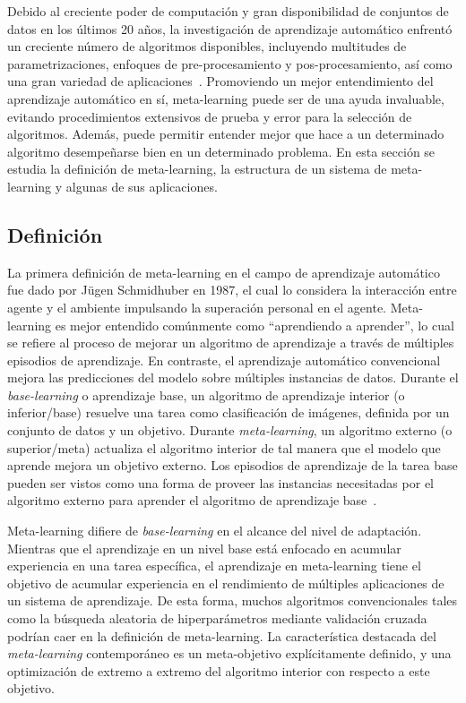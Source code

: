 Debido al creciente poder de computación y gran disponibilidad de conjuntos de
datos en los últimos 20 años, la investigación de aprendizaje automático
enfrentó un creciente número de algoritmos disponibles, incluyendo multitudes
de parametrizaciones, enfoques de pre-procesamiento y pos-procesamiento, así
como una gran variedad de aplicaciones~.
Promoviendo un mejor entendimiento del aprendizaje automático en sí,
meta-learning puede ser de una ayuda invaluable, evitando procedimientos
extensivos de prueba y error para la selección de algoritmos. Además, puede
permitir entender mejor que hace a un determinado algoritmo desempeñarse bien
en un determinado problema. En esta sección se estudia la definición de
meta-learning, la estructura de un sistema de meta-learning y algunas de sus
aplicaciones.

\subsection{Definición}\label{subsec:meta-definition}

La primera definición de meta-learning en el campo de aprendizaje automático
fue dado por J\"ugen Schmidhuber en 1987, el cual lo considera la interacción
entre agente y el ambiente impulsando la superación personal en el agente.
Meta-learning es mejor entendido comúnmente como ``aprendiendo a aprender'',
lo cual se refiere al proceso de mejorar un algoritmo de aprendizaje a través
de múltiples episodios de aprendizaje. En contraste, el aprendizaje automático
convencional mejora las predicciones del modelo sobre múltiples instancias de
datos. Durante el \textit{base-learning} o aprendizaje base, un algoritmo de
aprendizaje interior (o inferior/base) resuelve una tarea como clasificación
de imágenes, definida por un conjunto de datos y un objetivo. Durante
\emph{meta-learning}, un algoritmo externo (o superior/meta) actualiza el
algoritmo interior de tal manera que el modelo que aprende mejora un objetivo
externo. Los episodios de aprendizaje de la tarea base pueden ser vistos como
una forma de proveer las instancias necesitadas por el algoritmo externo para
aprender el algoritmo de aprendizaje base~\cite{hospedales2021metalearning}.

Meta-learning difiere de \textit{base-learning} en el alcance del nivel de
adaptación. Mientras que el aprendizaje en un nivel base está enfocado en
acumular experiencia en una tarea específica, el aprendizaje en meta-learning
tiene el objetivo de acumular experiencia en el rendimiento de múltiples
aplicaciones de un sistema de aprendizaje. De esta forma, muchos algoritmos
convencionales tales como la búsqueda aleatoria de hiperparámetros mediante
validación cruzada podrían caer en la definición de meta-learning. La
característica destacada del \emph{meta-learning} contemporáneo es un
meta-objetivo explícitamente definido, y una optimización de extremo a extremo
del algoritmo interior con respecto a este objetivo.

